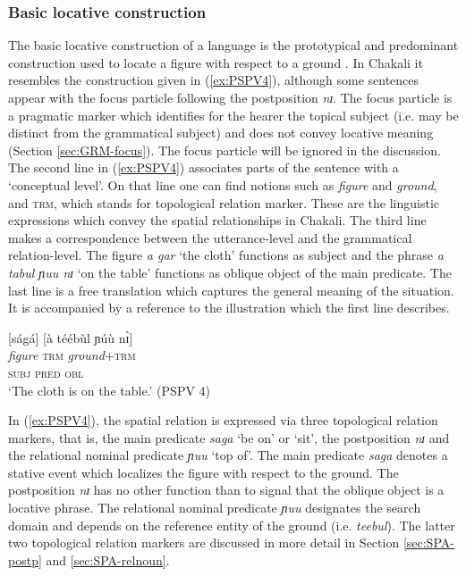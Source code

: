 % 

\subsubsection{Basic locative construction}
\label{sec:SPA-blc}


The  basic locative
construction  of a language is  the prototypical  and predominant
construction used to locate a figure with respect to a ground 
\citep[15]{Levi06}. In Chakali it resembles the construction given in
(\ref{ex:PSPV4}), although some sentences appear with the focus particle
following the postposition {\it nɪ}. The
focus particle is a pragmatic marker which identifies for the hearer the topical
subject (i.e. may be distinct from the grammatical subject) and does not convey
locative meaning (Section \ref{sec:GRM-focus}). The focus particle will be 
ignored in the discussion. 
The second line  in (\ref{ex:PSPV4}) associates parts of the sentence with a
`conceptual level'. On
that line one can find notions such as {\it figure} and {\it ground},  and 
\textsc{trm}, which stands for  topological
relation marker. These are the linguistic expressions which convey  the 
spatial
relationships in Chakali. The third line makes a correspondence between the
utterance-level and the grammatical relation-level. The figure {\it a gar} `the
 cloth'  functions as subject and the phrase {\it a tabul ɲuu nɪ}
`on the table' functions as oblique object  of the main
predicate. The last line is a free translation which captures  the
general meaning of the situation. It is accompanied by a reference to the
illustration which the first line describes.



\begin{exe}
\ex\label{ex:PSPV4}
\glll {[à gár]} {[ságá]} {[à téébùl ɲúù nɪ̀]}\\
\textit{figure} \textsc{trm} {\textit{ground}+\textsc{trm}}\\
 \textsc{subj}   \textsc{pred} \textsc{obl}\\
\glt `The cloth is on the table.' (PSPV 4)
\end{exe}


In (\ref{ex:PSPV4}), the spatial relation is expressed via three topological
relation markers, that is,  the main predicate {\it saga} `be on' or `sit', the
postposition  {\it nɪ} and the relational nominal predicate {\it ɲuu} `top of'.
The main predicate  {\it saga}  denotes a stative event which  localizes the
figure with respect to the ground.  The postposition  {\it nɪ} has no other
function than to signal that the oblique object is a locative phrase. The
relational nominal predicate {\it ɲuu} designates the search domain and depends
on the reference entity of the ground (i.e. {\it teebul}). The latter 
two topological
relation markers are discussed in more detail in Section 
\ref{sec:SPA-postp} and  \ref{sec:SPA-relnoun}.



